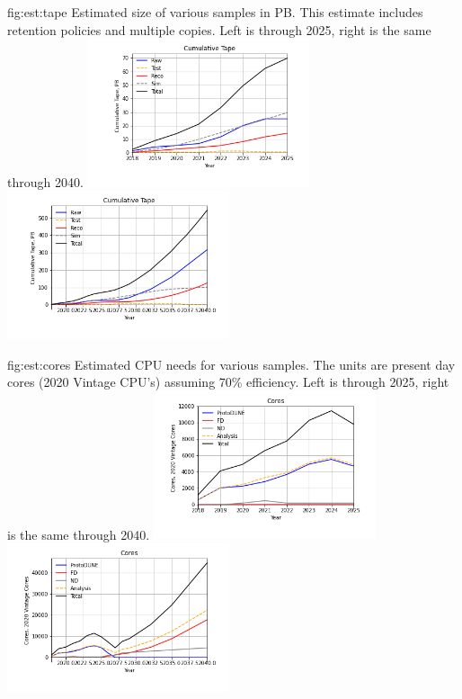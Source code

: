 \documentclass[../main-v1.tex]{subfiles}
\begin{document}
\begin{dunefigure}
{fig:est:tape}
{Estimated size of various samples in PB. This estimate includes retention policies and multiple copies. Left is through 2025, right is the same through 2040.}
\includegraphics[width=0.49\textwidth]{graphics/IntroFigures/soon/Cumulative-Tape.png}
\includegraphics[width=0.49\textwidth]{graphics/IntroFigures/2040/Cumulative-Tape.png}

\end{dunefigure}

\begin{dunefigure}
{fig:est:cores}
{Estimated CPU needs for  various samples.  The units are present day cores  (2020 Vintage CPU's) assuming 70\% efficiency. Left is through 2025, right is the same through 2040.}
\includegraphics[width=0.49\textwidth]{graphics/IntroFigures/soon/Cores.png}
\includegraphics[width=0.49\textwidth]{graphics/IntroFigures/2040/Cores.png}
\end{dunefigure}
\end{document}
